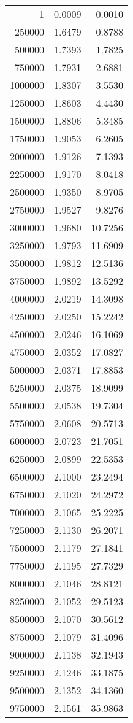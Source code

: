 \begin{table}
	\footnotesize
	\centering
	\begin{tabular}{|r|r|r|}
		1 & 0.0009 & 0.0010 \\ 
		250000 & 1.6479 & 0.8788 \\ 
		500000 & 1.7393 & 1.7825 \\ 
		750000 & 1.7931 & 2.6881 \\ 
		1000000 & 1.8307 & 3.5530 \\ 
		1250000 & 1.8603 & 4.4430 \\ 
		1500000 & 1.8806 & 5.3485 \\ 
		1750000 & 1.9053 & 6.2605 \\ 
		2000000 & 1.9126 & 7.1393 \\ 
		2250000 & 1.9170 & 8.0418 \\ 
		2500000 & 1.9350 & 8.9705 \\ 
		2750000 & 1.9527 & 9.8276 \\ 
		3000000 & 1.9680 & 10.7256 \\ 
		3250000 & 1.9793 & 11.6909 \\ 
		3500000 & 1.9812 & 12.5136 \\ 
		3750000 & 1.9892 & 13.5292 \\ 
		4000000 & 2.0219 & 14.3098 \\ 
		4250000 & 2.0250 & 15.2242 \\ 
		4500000 & 2.0246 & 16.1069 \\ 
		4750000 & 2.0352 & 17.0827 \\ 
		5000000 & 2.0371 & 17.8853 \\ 
		5250000 & 2.0375 & 18.9099 \\ 
		5500000 & 2.0538 & 19.7304 \\ 
		5750000 & 2.0608 & 20.5713 \\ 
		6000000 & 2.0723 & 21.7051 \\ 
		6250000 & 2.0899 & 22.5353 \\ 
		6500000 & 2.1000 & 23.2494 \\ 
		6750000 & 2.1020 & 24.2972 \\ 
		7000000 & 2.1065 & 25.2225 \\ 
		7250000 & 2.1130 & 26.2071 \\ 
		7500000 & 2.1179 & 27.1841 \\ 
		7750000 & 2.1195 & 27.7329 \\ 
		8000000 & 2.1046 & 28.8121 \\ 
		8250000 & 2.1052 & 29.5123 \\ 
		8500000 & 2.1070 & 30.5612 \\ 
		8750000 & 2.1079 & 31.4096 \\ 
		9000000 & 2.1138 & 32.1943 \\ 
		9250000 & 2.1246 & 33.1875 \\ 
		9500000 & 2.1352 & 34.1360 \\ 
		9750000 & 2.1561 & 35.9863 \\ 
	\end{tabular}
\end{table}